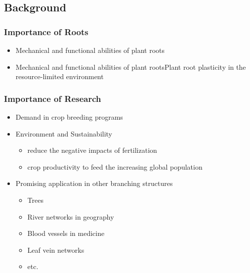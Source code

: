 

  \subsection{Background}

     \subsubsection{Importance of Roots}

        \begin{itemize}
          \item Mechanical and functional abilities of plant roots
          \item Mechanical and functional abilities of plant rootsPlant root plasticity in the resource-limited environment
        \end{itemize}
       
     \subsubsection{Importance of Research}

        \begin{itemize}
          \item Demand in crop breeding programs
          \item Environment and Sustainability
            \begin{itemize}
              \item reduce the negative impacts of fertilization
              \item crop productivity to feed the increasing global population
            \end{itemize}
            
          \item Promising application in other branching structures
            \begin{itemize}
              \item Trees
              \item River networks in geography
              \item Blood vessels in medicine
              \item Leaf vein networks
              \item etc.
            \end{itemize}
        \end{itemize}
        

